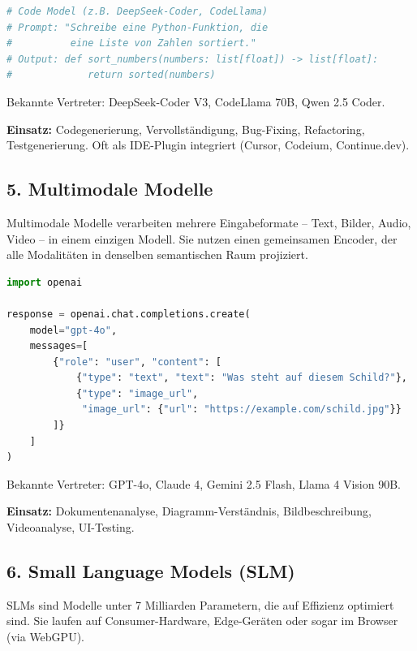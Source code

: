 \begin{lstlisting}[language=Python, caption={Code Model -- Generierung}, label=lst:code-model]
# Code Model (z.B. DeepSeek-Coder, CodeLlama)
# Prompt: "Schreibe eine Python-Funktion, die
#          eine Liste von Zahlen sortiert."
# Output: def sort_numbers(numbers: list[float]) -> list[float]:
#             return sorted(numbers)
\end{lstlisting}

Bekannte Vertreter: DeepSeek-Coder V3, CodeLlama 70B, Qwen 2.5 Coder.

\textbf{Einsatz:} Codegenerierung, Vervollständigung, Bug-Fixing, Refactoring, Testgenerierung. Oft als IDE-Plugin integriert (Cursor, Codeium, Continue.dev).

\subsection{5. Multimodale Modelle}

Multimodale Modelle verarbeiten mehrere Eingabeformate -- Text, Bilder, Audio, Video -- in einem einzigen Modell. Sie nutzen einen gemeinsamen Encoder, der alle Modalitäten in denselben semantischen Raum projiziert.

\begin{lstlisting}[language=Python, caption={Multimodales Modell -- Bildanalyse}, label=lst:multimodal]
import openai

response = openai.chat.completions.create(
    model="gpt-4o",
    messages=[
        {"role": "user", "content": [
            {"type": "text", "text": "Was steht auf diesem Schild?"},
            {"type": "image_url",
             "image_url": {"url": "https://example.com/schild.jpg"}}
        ]}
    ]
)
\end{lstlisting}

Bekannte Vertreter: GPT-4o, Claude 4, Gemini 2.5 Flash, Llama 4 Vision 90B.

\textbf{Einsatz:} Dokumentenanalyse, Diagramm-Verständnis, Bildbeschreibung, Videoanalyse, UI-Testing.

\subsection{6. Small Language Models (SLM)}

SLMs sind Modelle unter 7 Milliarden Parametern, die auf Effizienz optimiert sind. Sie laufen auf Consumer-Hardware, Edge-Geräten oder sogar im Browser (via WebGPU).

